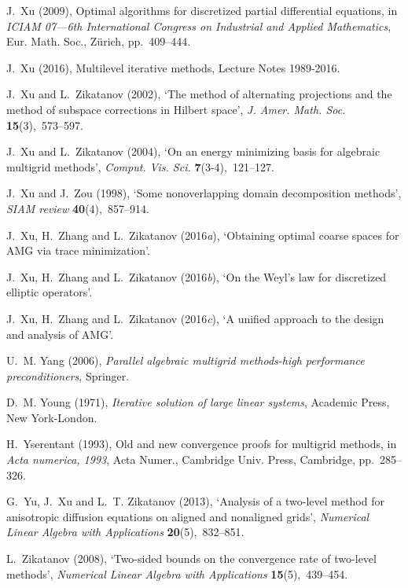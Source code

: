 \documentclass[12pt]{acta_2011xz}
\begin{document}
\begin{thebibliography}{xx}
J.~Xu  (2009), Optimal algorithms for discretized partial differential
  equations, in {\em I{CIAM} 07---6th {I}nternational {C}ongress on
  {I}ndustrial and {A}pplied {M}athematics}, Eur. Math. Soc., Z\"{u}rich,
  pp.~409--444.

J.~Xu  (2016), Multilevel iterative methods, Lecture Notes 1989-2016.

J.~Xu and L.~Zikatanov  (2002), `The method of alternating projections and the
  method of subspace corrections in {H}ilbert space', {\em J. Amer. Math. Soc.}
  {\bf 15}(3),~573--597.

J.~Xu and L.~Zikatanov  (2004), `On an energy minimizing basis for algebraic
  multigrid methods', {\em Comput. Vis. Sci.} {\bf 7}(3-4),~121--127.

J.~Xu and J.~Zou  (1998), `Some nonoverlapping domain decomposition methods',
  {\em SIAM review} {\bf 40}(4),~857--914.

J.~Xu, H.~Zhang and L.~Zikatanov  (2016{\em a}), `Obtaining optimal coarse
  spaces for {AMG} via trace minimization'.

J.~Xu, H.~Zhang and L.~Zikatanov  (2016{\em b}), `On the {W}eyl's law for
  discretized elliptic operators'.

J.~Xu, H.~Zhang and L.~Zikatanov  (2016{\em c}), `A unified approach to the
  design and analysis of {AMG}'.

U.~M. Yang  (2006), {\em Parallel algebraic multigrid methods-high performance
  preconditioners}, Springer.

D.~M. Young  (1971), {\em Iterative solution of large linear systems}, Academic
  Press, New York-London.

H.~Yserentant  (1993), Old and new convergence proofs for multigrid methods, in
  {\em Acta numerica, 1993}, Acta Numer., Cambridge Univ. Press, Cambridge,
  pp.~285--326.

G.~Yu, J.~Xu and L.~T. Zikatanov  (2013), `Analysis of a two-level method for
  anisotropic diffusion equations on aligned and nonaligned grids', {\em
  Numerical Linear Algebra with Applications} {\bf 20}(5),~832--851.

L.~Zikatanov  (2008), `Two-sided bounds on the convergence rate of two-level
  methods', {\em Numerical Linear Algebra with Applications} {\bf
  15}(5),~439--454.

\end{thebibliography}     


  
\end{document}
